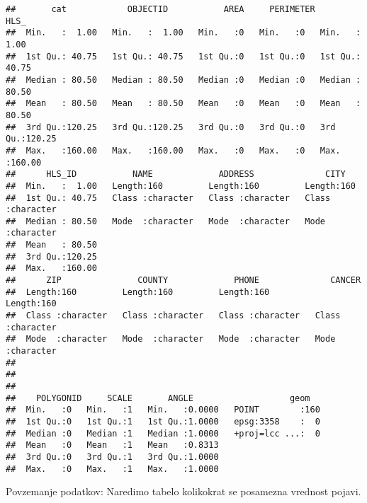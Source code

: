 \documentclass[]{article}
\newenvironment{Shaded}{\begin{snugshade}}{\end{snugshade}}
\newcommand{\KeywordTok}[1]{\textcolor[rgb]{0.13,0.29,0.53}{\textbf{#1}}}
\newcommand{\OperatorTok}[1]{\textcolor[rgb]{0.81,0.36,0.00}{\textbf{#1}}}
\newcommand{\NormalTok}[1]{#1}
\begin{document}
\begin{verbatim}
##       cat            OBJECTID           AREA     PERIMETER      HLS_       
##  Min.   :  1.00   Min.   :  1.00   Min.   :0   Min.   :0   Min.   :  1.00  
##  1st Qu.: 40.75   1st Qu.: 40.75   1st Qu.:0   1st Qu.:0   1st Qu.: 40.75  
##  Median : 80.50   Median : 80.50   Median :0   Median :0   Median : 80.50  
##  Mean   : 80.50   Mean   : 80.50   Mean   :0   Mean   :0   Mean   : 80.50  
##  3rd Qu.:120.25   3rd Qu.:120.25   3rd Qu.:0   3rd Qu.:0   3rd Qu.:120.25  
##  Max.   :160.00   Max.   :160.00   Max.   :0   Max.   :0   Max.   :160.00  
##      HLS_ID           NAME             ADDRESS              CITY          
##  Min.   :  1.00   Length:160         Length:160         Length:160        
##  1st Qu.: 40.75   Class :character   Class :character   Class :character  
##  Median : 80.50   Mode  :character   Mode  :character   Mode  :character  
##  Mean   : 80.50                                                           
##  3rd Qu.:120.25                                                           
##  Max.   :160.00                                                           
##      ZIP               COUNTY             PHONE              CANCER         
##  Length:160         Length:160         Length:160         Length:160        
##  Class :character   Class :character   Class :character   Class :character  
##  Mode  :character   Mode  :character   Mode  :character   Mode  :character  
##                                                                             
##                                                                             
##                                                                             
##    POLYGONID     SCALE       ANGLE                   geom    
##  Min.   :0   Min.   :1   Min.   :0.0000   POINT        :160  
##  1st Qu.:0   1st Qu.:1   1st Qu.:1.0000   epsg:3358    :  0  
##  Median :0   Median :1   Median :1.0000   +proj=lcc ...:  0  
##  Mean   :0   Mean   :1   Mean   :0.8313                      
##  3rd Qu.:0   3rd Qu.:1   3rd Qu.:1.0000                      
##  Max.   :0   Max.   :1   Max.   :1.0000
\end{verbatim}

Povzemanje podatkov: Naredimo tabelo kolikokrat se posamezna vrednost
pojavi.

\begin{Shaded}
\end{Shaded}
\end{document}

